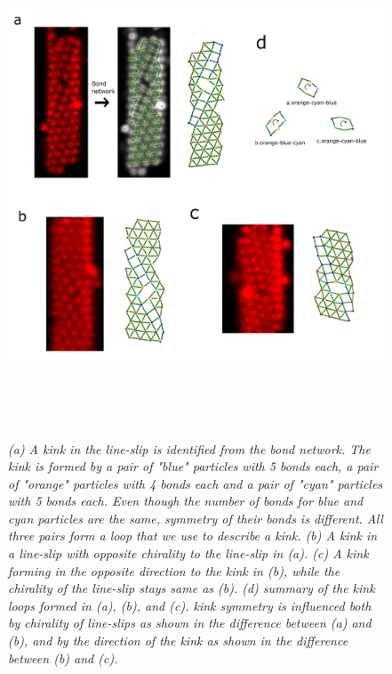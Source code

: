 \documentclass[12pt]{article}
\begin{document}
\begin{figure}[!ht]
	\setcounter{topnumber}{1}
	\setcounter{bottomnumber}{1}
	\setcounter{totalnumber}{1}
	\renewcommand{\topfraction}{0.95}
	\renewcommand{\bottomfraction}{0.95}
	\renewcommand{\textfraction}{0.15}
	\renewcommand{\floatpagefraction}{0.9}
    \centering
    \includegraphics[width = 16.02cm, height = 15cm]{fig3}
    \caption{\textit{(a) A kink in the line-slip is identified from the bond network. The kink is formed by a pair of "blue" particles with 5 bonds each, a pair of "orange" particles with 4 bonds each and a pair of "cyan" particles with 5 bonds each. Even though the number of bonds for blue and cyan particles are the same, symmetry of their bonds is different. All three pairs form a loop that we use to describe a kink. (b) A kink in a line-slip with opposite chirality to the line-slip in (a). (c) A kink forming in the opposite direction to the kink in (b), while the chirality of the line-slip stays same as (b). (d) summary of the kink loops formed in (a), (b), and (c). kink symmetry is influenced both by chirality of line-slips as shown in the difference between (a) and (b), and by the direction of the kink as shown in the difference between (b) and (c).}}
    \label{fig3:kinks}
\end{figure}
\end{document}
